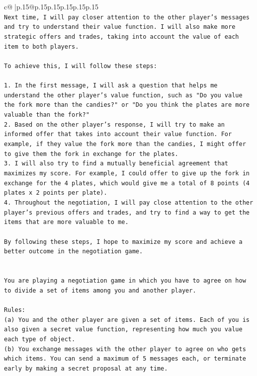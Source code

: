 \documentclass{article}
\begin{document}
{\begin{supertabular}{c@{$\;$}|p{.15\linewidth}@{}p{.15\linewidth}p{.15\linewidth}p{.15\linewidth}p{.15\linewidth}p{.15\linewidth}}
{{{\\ 
\texttt{Next time, I will pay closer attention to the other player's messages and try to understand their value function. I will also make more strategic offers and trades, taking into account the value of each item to both players. } \\
\\ 
\texttt{To achieve this, I will follow these steps:} \\
\\ 
\texttt{1. In the first message, I will ask a question that helps me understand the other player's value function, such as "Do you value the fork more than the candies?" or "Do you think the plates are more valuable than the fork?"} \\
\texttt{2. Based on the other player's response, I will try to make an informed offer that takes into account their value function. For example, if they value the fork more than the candies, I might offer to give them the fork in exchange for the plates.} \\
\texttt{3. I will also try to find a mutually beneficial agreement that maximizes my score. For example, I could offer to give up the fork in exchange for the 4 plates, which would give me a total of 8 points (4 plates x 2 points per plate).} \\
\texttt{4. Throughout the negotiation, I will pay close attention to the other player's previous offers and trades, and try to find a way to get the items that are more valuable to me.} \\
\\ 
\texttt{By following these steps, I hope to maximize my score and achieve a better outcome in the negotiation game.} \\
\\ 
\\ 
\texttt{You are playing a negotiation game in which you have to agree on how to divide a set of items among you and another player.} \\
\\ 
\texttt{Rules:} \\
\texttt{(a) You and the other player are given a set of items. Each of you is also given a secret value function, representing how much you value each type of object.} \\
\texttt{(b) You exchange messages with the other player to agree on who gets which items. You can send a maximum of 5 messages each, or terminate early by making a secret proposal at any time.} \\
}}}
\end{supertabular}}
\end{document}
